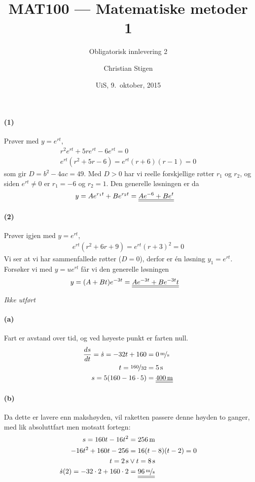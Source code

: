 \documentclass[a4paper,norsk,12pt]{article}
\title{MAT100 --- Matematiske metoder 1}
\subtitle{Obligatorisk innlevering 2}
\author{Christian Stigen}
\date{UiS, 9.~oktober, 2015}
\begin{document}
\maketitle

\paragraph{(1)} Prøver med $y=e^{rt}$,
\begin{align*}
  r^2e^{rt} + 5re^{rt} - 6e^{rt} = 0 \\
  e^{rt}(r^2+5r-6) = e^{rt}(r+6)(r-1) = 0
\end{align*}
%
som gir $D = b^2 - 4ac = 49$. Med $D > 0$ har vi reelle forskjellige røtter
$r_1$ og $r_2$, og siden $e^{rt} \neq 0$ er $r_1=-6$ og $r_2=1$. Den generelle
løsningen er da
%
\begin{align*}
  y & = Ae^{r_1t} + Be^{r_2t} = {\underline{\underline{Ae^{-6} + Be^t}}}
\end{align*}

\paragraph{(2)} Prøver igjen med $y=e^{rt}$,
\begin{align*}
  e^{rt}(r^2 + 6r + 9) = e^{rt}(r+3)^2 = 0
\end{align*}
Vi ser at vi har sammenfallede røtter ($D=0$), derfor er én løsning $y_1 =
e^{rt}$. Forsøker vi med $y = ue^{rt}$ får vi den generelle løsningen
\begin{align*}
  y & = (A + Bt)e^{-3t} = {\underline{\underline{Ae^{-3t} + Be^{-3t}t}}}
\end{align*}

\textit{Ikke utført}

\paragraph{(a)}
Fart er avstand over tid, og ved høyeste punkt er farten null.
\begin{align*}
  \frac{ds}{dt} = \dot{s} = -32t + 160 & = \unitfrac[0]{m}{s} \\
  t = \nicefrac{160}{32} & = \unit[5]{s} \\
  s = 5(160-16\cdot5) & = \svar{\unit[400]{m}}
\end{align*}

\paragraph{(b)}
Da dette er lavere enn makshøyden, vil raketten passere denne høyden to ganger,
med lik absoluttfart men motsatt fortegn:
\begin{align*}
  s  = 160t-16t^2 & = \unit[256]{m} \\
  -16t^2+160t-256 & = 16(t-8)(t-2) = 0 \\
  t = \unit[2]{s} & \vee t = \unit[8]{s} \\
  \dot{s}(2) = -32\cdot2 + 160\cdot2 & = \svar{\unitfrac[96]{m}{s}}
\end{align*}
\end{document}
